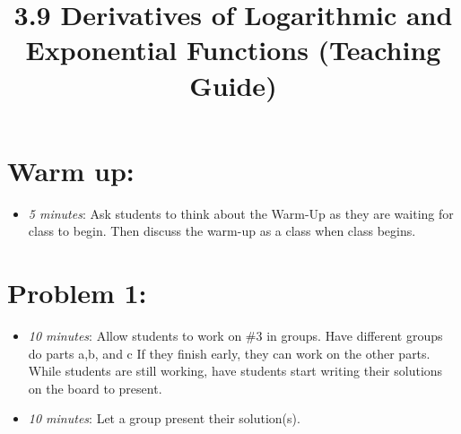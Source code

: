 \documentclass[handout,nooutcomes]{ximera}
\title{3.9 Derivatives of Logarithmic and Exponential Functions (Teaching Guide)}
\begin{document}
\begin{abstract}		\end{abstract}
\maketitle


\section*{Warm up:} 
	
	\begin{itemize}
	
	\item  \emph{5 minutes}:  Ask students to think about the Warm-Up as they are waiting for class to begin.  Then discuss the warm-up as a class when class begins.
	
	
	
	\end{itemize}


\section*{Problem 1:}

	\begin{itemize}
	
	\item  \emph{10 minutes}:  Allow students to work on \#3 in groups. Have different groups do parts a,b, and c  If they finish early, they can work on the other parts.  While students are still working, have students start writing their solutions on the board to present.
	
	\item  \emph{10 minutes}:  Let a group present their solution(s).
	
	\end{itemize}



	
	
	

	
	

	
	
	

	
	
	
\end{document}
